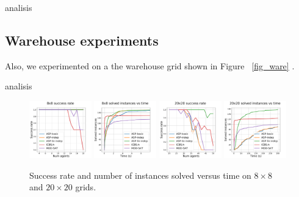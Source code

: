 analisis


\subsection{Warehouse experiments}
Also, we experimented on a the warehouse grid shown in Figure ~\ref{fig_ware} . 

analisis




\begin{figure}
    \includegraphics[width=0.24\textwidth]{graphs/8x8succ.pdf}
    \includegraphics[width=0.24\textwidth]{graphs/8x8runtime.pdf}
    \includegraphics[width=0.24\textwidth]{graphs/20x20succ.pdf}
    \includegraphics[width=0.24\textwidth]{graphs/20x20runtime.pdf}
    \caption{Success rate and number of instances solved versus time on $8\times 8$ and $20\times 20$ grids.}
    
    \label{fig_obs}
\end{figure}

